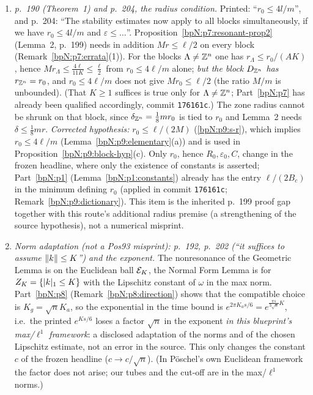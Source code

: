\begin{remark}\label{bpN:p9:errata}
\begin{enumerate}[label=(\arabic*)]
\item \emph{p.~190 (Theorem~1) and p.~204, the radius condition.} Printed: ``$r_0\le4l/m$'', and p.~204: ``The stability estimates now apply to all blocks simultaneously, if we have $r_0\le4l/m$ and $\varepsilon\le\dots$''. Proposition~\ref{bpN:p7:resonant-prop2} (Lemma~2, p.~199) needs in addition $Mr\le\ell/2$ on every block (Remark~\ref{bpN:p7:errata}(1)). For the blocks $\Lambda\ne\mathbb{Z}^n$ one has $r_\Lambda\le r_0/(AK)$, hence $Mr_\Lambda\le\frac{4\ell}{11K}\le\frac\ell2$ from $r_0\le4\ell/m$ alone; \emph{but the block $D_{\mathbb{Z}^n}$ has $r_{\mathbb{Z}^n}=r_0$}, and $r_0\le4\ell/m$ does not give $Mr_0\le\ell/2$ (the ratio $M/m$ is unbounded). (That $K\ge1$ suffices is true only for $\Lambda\ne\mathbb{Z}^n$; Part~\ref{bpN:p7} has already been qualified accordingly, commit \texttt{176161c}.) The zone radius cannot be shrunk on that block, since $\delta_{\mathbb{Z}^n}=\frac18mr_0$ is tied to $r_0$ and Lemma~2 needs $\delta\le\frac18mr$. \emph{Corrected hypothesis:} $r_0\le\ell/(2M)$ (\ref{bpN:p9:s-r}), which implies $r_0\le4\ell/m$ (Lemma~\ref{bpN:p9:elementary}(a)) and is used in Proposition~\ref{bpN:p9:block-hyp}(c). Only $r_0$, hence $R_0,\varepsilon_0,C$, change in the frozen headline, where only the existence of constants is asserted; Part~\ref{bpN:p1} (Lemma~\ref{bpN:p1:constants}) already has the entry $\ell/(2B_c)$ in the minimum defining $r_0$ (applied in commit \texttt{176161c}; Remark~\ref{bpN:p9:dictionary}). This item is the inherited p.~199 proof gap together with this route's additional radius premise (a strengthening of the source hypothesis), not a numerical misprint.
\item \emph{Norm adaptation (not a Pos93 misprint): p.~192, p.~202 (``it suffices to assume $\lVert k\rVert\le K$'') and the exponent.} The nonresonance of the Geometric Lemma is on the Euclidean ball $\mathcal E_K$, the Normal Form Lemma is for $Z_K=\{\lvert k\rvert_1\le K\}$ with the Lipschitz constant of $\omega$ in the max norm. Part~\ref{bpN:p8} (Remark~\ref{bpN:p8:direction}) shows that the compatible choice is $K_g=\sqrt nK_a$, so the exponential in the time bound is $e^{2\pi K_as/6}=e^{\frac{\pi s}{3\sqrt n}K}$, i.e.\ the printed $e^{Ks/6}$ loses a factor $\sqrt n$ in the exponent \emph{in this blueprint's max/$\ell^1$ framework}: a disclosed adaptation of the norms and of the chosen Lipschitz estimate, not an error in the source. This only changes the constant $c$ of the frozen headline ($c\to c/\sqrt n$). (In P\"oschel's own Euclidean framework the factor does not arise; our tubes and the cut-off are in the max/$\ell^1$ norms.)

\end{enumerate}
\end{remark}

